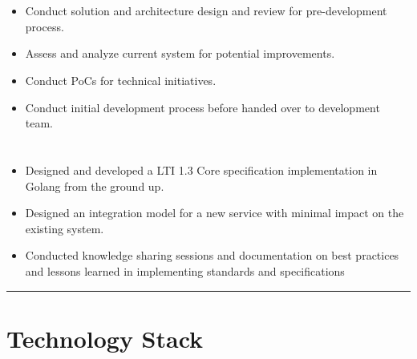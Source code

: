\documentclass[12pt]{res}
\begin{document}
\begin{resume}
\begin{multicols}{2}
	\section{}
		\begin{itemize}
			\item Conduct solution and architecture design and review for pre-development process.

\item Assess and analyze current system for potential improvements.

\item Conduct PoCs for technical initiatives.

\item Conduct initial development process before handed over to development team.
		\end{itemize}
	\section{}
		\begin{itemize}
			\setlength{\itemindent}{0pt}
			\item Designed and developed a LTI 1.3 Core specification implementation in Golang from the ground up.

\item Designed an integration model for a new service with minimal impact on the existing system.

\item Conducted knowledge sharing sessions and documentation on best practices and lessons learned in implementing standards and specifications
		\end{itemize}
\end{multicols}

\vspace{-20pt}
\begin{minipage}[t]{0.55\linewidth}
	\rule{0.25\textwidth}{2pt}
	\begin{multicols}{2}
		\section{Technology Stack}
		\columnbreak
		\section{}
	\end{multicols}
	\vspace{1pt}
\end{minipage}
\hfill
\begin{minipage}[t]{0.42\linewidth}
	\vspace{18pt}

\end{minipage}
\end{resume}
\end{document}
